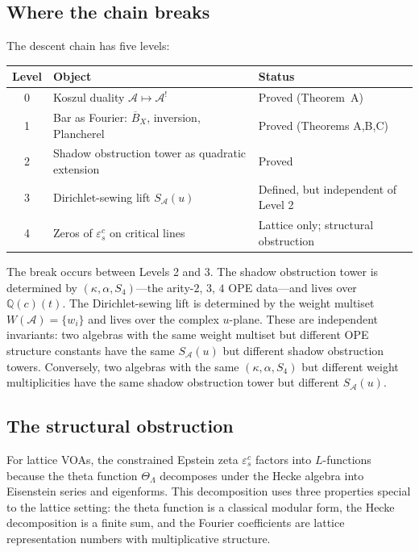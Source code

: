 \documentclass[11pt]{article}
\newcommand{\cA}{\mathcal{A}}
\newcommand{\barB}{\overline{B}}
\newcommand{\Q}{\mathbb{Q}}
\begin{document}
\subsection{Where the chain breaks}

The descent chain has five levels:

\begin{center}
\small
\renewcommand{\arraystretch}{1.15}
\begin{tabular}{@{}cll@{}}
\textbf{Level} & \textbf{Object} & \textbf{Status} \\
\hline
0 & Koszul duality $\cA \mapsto \cA^!$
  & Proved (Theorem~A) \\
1 & Bar as Fourier: $\barB_X$, inversion, Plancherel
  & Proved (Theorems A,B,C) \\
2 & Shadow obstruction tower as quadratic extension
  & Proved \\
3 & Dirichlet-sewing lift $S_\cA(u)$
  & Defined, but independent of Level 2 \\
4 & Zeros of $\varepsilon^c_s$ on critical lines
  & Lattice only; structural obstruction
\end{tabular}
\end{center}

The break occurs between Levels 2 and 3.  The shadow obstruction tower
is determined by $(\kappa, \alpha, S_4)$---the arity-$2$, $3$,
$4$ OPE data---and lives over $\Q(c)(t)$.  The Dirichlet-sewing
lift is determined by the weight multiset $W(\cA) = \{w_i\}$
and lives over the complex $u$-plane.  These are independent
invariants: two algebras with the same weight multiset but
different OPE structure constants have the same $S_\cA(u)$ but
different shadow obstruction towers.  Conversely, two algebras with the same
$(\kappa, \alpha, S_4)$ but different weight multiplicities have
the same shadow obstruction tower but different $S_\cA(u)$.

\subsection{The structural obstruction}

For lattice VOAs, the constrained Epstein zeta $\varepsilon^c_s$
factors into $L$-functions because the theta function $\Theta_\Lambda$
decomposes under the Hecke algebra into Eisenstein series and
eigenforms.  This decomposition uses three properties special to
the lattice setting: the theta function is a classical modular form,
the Hecke decomposition is a finite sum, and the Fourier coefficients
are lattice representation numbers with multiplicative structure.
\end{document}
